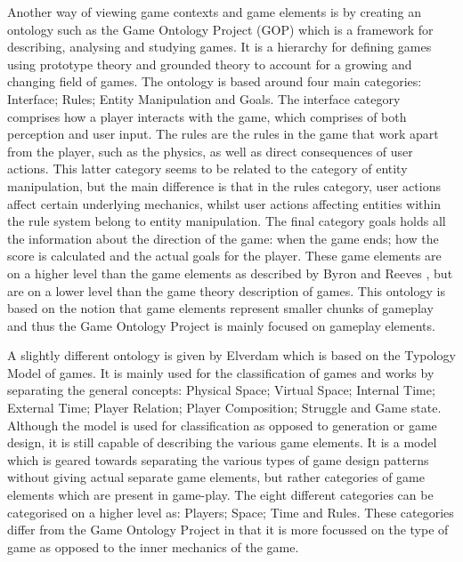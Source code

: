 \documentclass[11pt]{article}
\begin{document}
Another way of viewing game contexts and game elements is by creating an ontology such as the Game Ontology Project (GOP) \cite{Zagal2008} which is a framework for describing, analysing and studying games. It is a hierarchy for defining games using prototype theory and grounded theory to account for a growing and changing field of games. The ontology is based around four main categories: Interface; Rules; Entity Manipulation and Goals. The interface category comprises how a player interacts with the game, which comprises of both perception and user input. The rules are the rules in the game that work apart from the player, such as the physics, as well as direct consequences of user actions. This latter category seems to be related to the category of entity manipulation, but the main difference is that in the rules category, user actions affect certain underlying mechanics, whilst user actions affecting entities within the rule system belong to entity manipulation. The final category goals holds all the 
information about the direction of the game: when the game ends; how the score is calculated and the actual goals for the player.
These game elements are on a higher level than the game elements as described by Byron and Reeves \cite{Byron2009}, but are on a lower level than the game theory description of games. This ontology is based on the notion that game elements represent smaller chunks of gameplay \cite{Zagal2009} and thus the Game Ontology Project is mainly focused on gameplay elements.

A slightly different ontology is given by Elverdam \cite{Elverdam2007} which is based on the Typology Model of games. It is mainly used for the classification of games and works by separating the general concepts: Physical Space; Virtual Space; Internal Time; External Time; Player Relation; Player Composition; Struggle and Game state. Although the model is used for classification as opposed to generation or game design, it is still capable of describing the various game elements. It is a model which is geared towards separating the various types of game design patterns without giving actual separate game elements, but rather categories of game elements which are present in game-play. The eight different categories can be categorised on a higher level as: Players; Space; Time and Rules. These categories differ from the Game Ontology Project in that it is more focussed on the type of game as opposed to the inner mechanics of the game.
\end{document}
